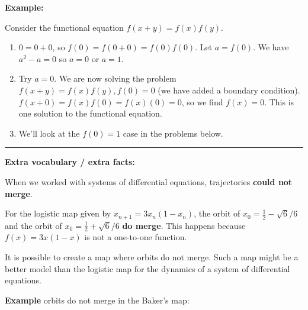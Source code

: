 \documentclass[12pt,letterpaper,noanswers]{exam}
\begin{document}
\noindent\textbf{Example:}

Consider the functional equation $f(x+y) = f(x)f(y)$.

\begin{enumerate}
\itemsep0em
    \item $0 = 0+0$, so $f(0) = f(0+0) = f(0)f(0)$.  Let $a = f(0)$.  We have $a^2 - a = 0$ so $a = 0$ or $a = 1$.
    \item Try $a = 0$.  We are now solving the problem $f(x+y) = f(x)f(y), f(0) = 0$ (we have added a boundary condition).  $f(x+0) = f(x)f(0) = f(x)(0) = 0$, so we find $f(x) = 0$.  This is one solution to the functional equation.
    \item We'll look at the $f(0) = 1$ case in the problems below.
\end{enumerate}

\vspace{0.2cm}
\hrule
\vspace{0.2cm}

\noindent \textbf{Extra vocabulary / extra facts:}
\begin{tcolorbox}
When we worked with systems of differential equations, trajectories \textbf{could not merge}.

For the logistic map given by $x_{n+1} = 3 x_n(1-x_n)$, the orbit of $x_0 = \frac{1}{2} - \sqrt{6}/6$ and the orbit of $x_0 = \frac{1}{2}+\sqrt{6}/6$ \textbf{do merge}.  This happens because $f(x) = 3x(1-x)$ is not a one-to-one function.

It is possible to create a map where orbits do not merge.  Such a map might be a better model than the logistic map for the dynamics of a system of differential equations.
\end{tcolorbox}

\textbf{Example} orbits do not merge in the Baker's map:
\end{document}
